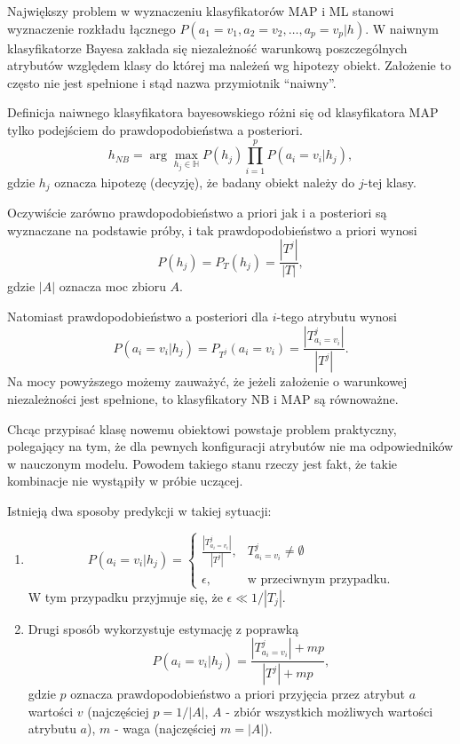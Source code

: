 \documentclass[]{book}
\providecommand{\tightlist}{%
  \setlength{\itemsep}{0pt}\setlength{\parskip}{0pt}}
\theoremstyle{plain}
\theoremstyle{definition}
\theoremstyle{definition}
\theoremstyle{definition}
\theoremstyle{definition}
\theoremstyle{remark}
\begin{document}
Największy problem w wyznaczeniu klasyfikatorów MAP i ML stanowi wyznaczenie rozkładu łącznego \(P(a_1=v_1, a_2=v_2,\ldots,a_p=v_p|h)\). W naiwnym klasyfikatorze Bayesa zakłada się niezależność warunkową poszczególnych atrybutów względem klasy do której ma należeń wg hipotezy obiekt. Założenie to często nie jest spełnione i stąd nazwa przymiotnik ``naiwny''.

Definicja naiwnego klasyfikatora bayesowskiego różni się od klasyfikatora MAP tylko podejściem do prawdopodobieństwa a posteriori.
\begin{equation}\label{naiwny_bayes}
        h_{NB}=\operatorname{arg}\max_{h_j\in \mathbb{H}}P(h_j)\prod_{i=1}^{p}P(a_i=v_i|h_j),
\end{equation}
gdzie \(h_j\) oznacza hipotezę (decyzję), że badany obiekt należy do \(j\)-tej klasy.

Oczywiście zarówno prawdopodobieństwo a priori jak i a posteriori są wyznaczane na podstawie próby, i tak prawdopodobieństwo a priori wynosi
\begin{equation}\label{apriori}
        P(h_j)=P_T(h_j)=\frac{|T^j|}{|T|}, 
\end{equation}
gdzie \(|A|\) oznacza moc zbioru \(A\).

Natomiast prawdopodobieństwo a posteriori dla \(i\)-tego atrybutu wynosi
\begin{equation}\label{aposteriori}
        P(a_i=v_i|h_j)=P_{T^j}(a_i=v_i)=\frac{|T^j_{a_i=v_i}|}{|T^j|}.
\end{equation}
Na mocy powyższego możemy zauważyć, że jeżeli założenie o warunkowej niezależności jest spełnione, to klasyfikatory NB i MAP są równoważne.

Chcąc przypisać klasę nowemu obiektowi powstaje problem praktyczny, polegający na tym, że dla pewnych konfiguracji atrybutów nie ma odpowiedników w nauczonym modelu. Powodem takiego stanu rzeczy jest fakt, że takie kombinacje nie wystąpiły w próbie uczącej.

Istnieją dwa sposoby predykcji w takiej sytuacji:

\begin{enumerate}
\def\labelenumi{\arabic{enumi}.}
\tightlist
\item
  \begin{equation}\label{pred1}
           P(a_i=v_i|h_j)=
           \begin{cases}
               \frac{|T^j_{a_i=v_i}|}{|T^j|}, & T^j_{a_i=v_i}\neq \emptyset\\
               \epsilon, & \text{w przeciwnym przypadku.}
           \end{cases}
   \end{equation}
  W tym przypadku przyjmuje się, że \(\epsilon \ll 1/|T_j|\).
\item
  Drugi sposób wykorzystuje estymację z poprawką
  \begin{equation}\label{pred2}
       P(a_i=v_i|h_j)=\frac{|T^j_{a_i=v_i}|+mp}{|T^j|+mp},
  \end{equation}
  gdzie \(p\) oznacza prawdopodobieństwo a priori przyjęcia przez atrybut \(a\) wartości \(v\) (najczęściej \(p=1/|A|\), \(A\) - zbiór wszystkich możliwych wartości atrybutu \(a\)), \(m\) - waga (najczęściej \(m=|A|\)).
\end{enumerate}
\end{document}
